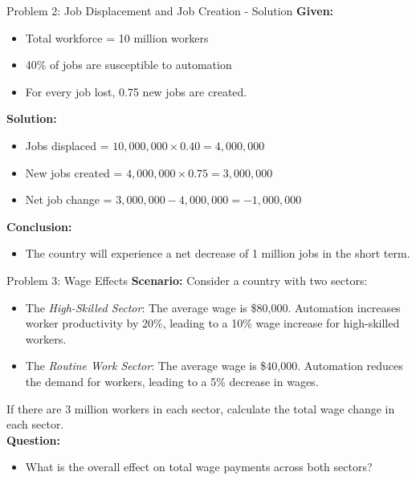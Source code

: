 \documentclass{beamer}
\begin{document}
\begin{frame}{Problem 2: Job Displacement and Job Creation - Solution}
\textbf{Given:}
\begin{itemize}
    \item Total workforce = 10 million workers
    \item 40\% of jobs are susceptible to automation
    \item For every job lost, 0.75 new jobs are created.
\end{itemize}

\textbf{Solution:}
\begin{itemize}
    \item Jobs displaced = \( 10,000,000 \times 0.40 = 4,000,000 \)
    \item New jobs created = \( 4,000,000 \times 0.75 = 3,000,000 \)
    \item Net job change = \( 3,000,000 - 4,000,000 = -1,000,000 \)
\end{itemize}

\textbf{Conclusion:}
\begin{itemize}
    \item The country will experience a net decrease of 1 million jobs in the short term.
\end{itemize}
\end{frame}







\begin{frame}{Problem 3: Wage Effects}
\textbf{Scenario:}
Consider a country with two sectors:
\begin{itemize}
    \item The \textit{High-Skilled Sector}: The average wage is \$80,000. Automation increases worker productivity by 20\%, leading to a 10\% wage increase for high-skilled workers.
    \item The \textit{Routine Work Sector}: The average wage is \$40,000. Automation reduces the demand for workers, leading to a 5\% decrease in wages.
\end{itemize}

If there are 3 million workers in each sector, calculate the total wage change in each sector.
\vspace{.5cm}\\
\textbf{Question:}
\begin{itemize}
    \item What is the overall effect on total wage payments across both sectors?
\end{itemize}
\end{frame}
\end{document}
